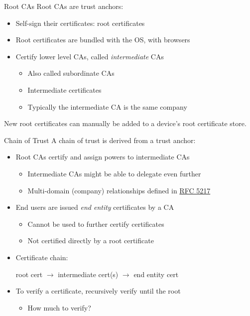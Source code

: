 \begin{frame}{Root CAs}
  Root CAs are trust anchors:
  \begin{itemize}[<+(1)->]
    \item Self-sign their certificates: root certificates
    \item Root certificates are bundled with the OS, with browsers
    \item Certify lower level CAs, called \emph{intermediate} CAs
    \begin{itemize}
      \item Also called subordinate CAs
      \item Intermediate certificates
      \item Typically the intermediate CA is the same company
    \end{itemize}
  \end{itemize}

  \pause
  New root certificates can manually be added to a device's root certificate store.
\end{frame}

\begin{frame}{Chain of Trust}
  A chain of trust is derived from a trust anchor:
  \begin{itemize}[<+(1)->]
    \item Root CAs certify and assign powers to intermediate CAs
    \begin{itemize}
      \item Intermediate CAs might be able to delegate even further
      \item Multi-domain (company) relationships defined in \href{https://datatracker.ietf.org/doc/html/rfc5217}{RFC 5217}
    \end{itemize}
    \item End users are issued \emph{end entity} certificates by a CA
    \begin{itemize}
      \item Cannot be used to further certify certificates
      \item Not certified directly by a root certificate
    \end{itemize}
    \item Certificate chain:
    \begin{center}
      root cert $\to$ intermediate cert(s) $\to$ end entity cert
    \end{center}
    \vspace*{1em}
    \item To verify a certificate, recursively verify until the root
    \begin{itemize}[<+(1)->]
      \item How much to verify?
    \end{itemize}
  \end{itemize}
\end{frame}

